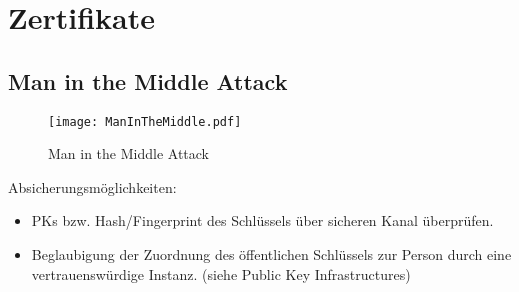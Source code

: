 \chapter{Zertifikate}
\section{Man in the Middle Attack}
\begin{figure}[htp]
	\centering
	\texttt{[image: ManInTheMiddle.pdf]}
	\caption{Man in the Middle Attack}
\end{figure}
Absicherungsmöglichkeiten:
\begin{itemize}
  \item PKs bzw. Hash/Fingerprint des Schlüssels über sicheren Kanal überprüfen.
  \item Beglaubigung der Zuordnung des öffentlichen Schlüssels zur Person durch eine vertrauenswürdige Instanz. (siehe Public Key Infrastructures)
\end{itemize}